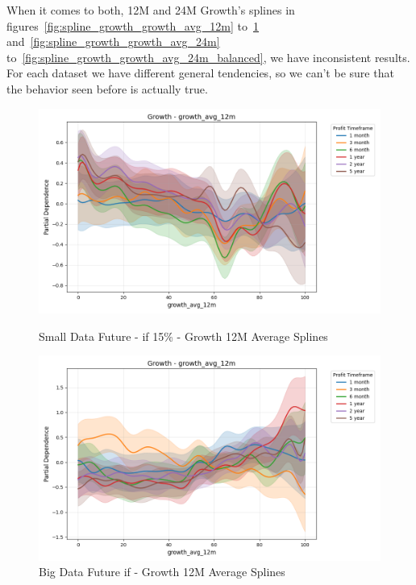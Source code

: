 \documentclass[11pt,english,a4paper,hidelinks]{book}
\begin{document}
\noindent When it comes to both, 12M and 24M Growth's splines in figures~\ref{fig:spline_growth_growth_avg_12m} to~\ref{fig:spline_growth_growth_avg_12m_balanced} and~\ref{fig:spline_growth_growth_avg_24m} to~\ref{fig:spline_growth_growth_avg_24m_balanced}, we have inconsistent results. For each dataset we have different general tendencies, so we can't be sure that the behavior seen before is actually true.
\begin{figure}[H]
    \centering
    \begin{minipage}{0.48\textwidth}
        \centering
        \includegraphics[width=\textwidth]{images/code/models/general_regression/splines/2D/Small Data future - IF/growth_growth_avg_12m.png}
        \caption{Small Data Future - \acrshort{if} 15\% - Growth 12M Average Splines}
        \label{fig:spline_growth_growth_avg_12m}
    \end{minipage}\hfill
    \begin{minipage}{0.48\textwidth}
        \centering
        \includegraphics[width=\textwidth]{images/code/models/general_regression/splines/2D/Big Data future - IF HARD Balanced/growth_growth_avg_12m.png}
        \caption{Big Data Future \acrshort{if} - Growth 12M Average Splines}
        \label{fig:spline_growth_growth_avg_12m_balanced}
    \end{minipage}
\end{figure}
\end{document}
